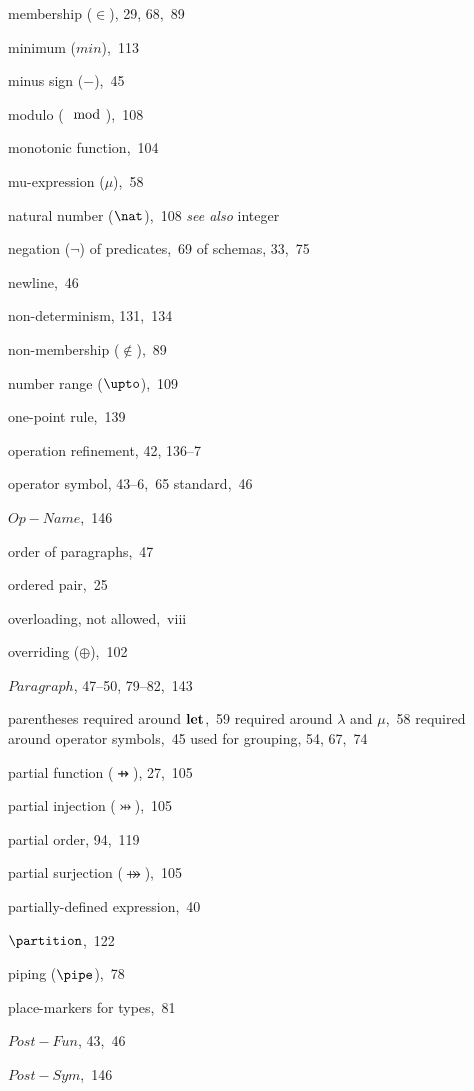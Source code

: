 \begin{theindex}
\item membership ($\in$), 29, 68,~89
\item minimum ($min$),~113
\item minus sign ($\minus$),~45
\item modulo ($\mod$),~108
\item monotonic function,~104
\item mu-expression ($\mu$),~58
\indexspace %
\item natural number ($\nat$),~108 {\em see also\/} integer
\item negation ($\neg$)
  \subitem of predicates,~69
  \subitem of schemas, 33,~75
\item newline,~46
\item non-determinism, 131,~134
\item non-membership ($\notin$),~89
\item number range ($\upto$),~109
\indexspace %
\item one-point rule,~139
\item operation refinement, 42, 136--7
\item operator symbol, 43--6,~65
  \subitem standard,~46
\item \(Op-Name\),~146
\item order of paragraphs,~47
\item ordered pair,~25
\item overloading, not allowed,~viii
\item overriding ($\oplus$),~102
\indexspace %
\item \(Paragraph\), 47--50, 79--82,~143
\item parentheses
  \subitem required around $\bf let$,~59
  \subitem required around $\lambda$ and $\mu$,~58
  \subitem required around operator symbols,~45
  \subitem used for grouping, 54, 67,~74
\item partial function ($\pfun$), 27,~105
\item partial injection ($\pinj$),~105
\item partial order, 94,~119
\item partial surjection ($\psurj$),~105
\item partially-defined expression,~40
\item $\partition$,~122
\item piping ($\pipe$),~78
\item place-markers for types,~81
\item \(Post-Fun\), 43,~46
\item \(Post-Sym\),~146

\end{theindex}
